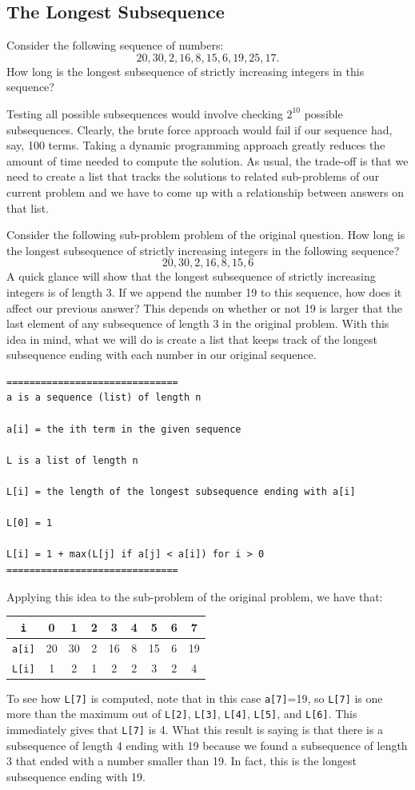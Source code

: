 \documentclass{ximera}
\begin{document}
\subsection{The Longest Subsequence}

Consider the following sequence of numbers: $$20,30,2,16,8,15,6,19,25,17.$$ How long is the longest subsequence of strictly increasing integers in this sequence?

Testing all possible subsequences would involve checking $2^{10}$ possible subsequences. Clearly, the brute force approach would fail if our sequence had, say, 100 terms. Taking a dynamic programming approach greatly reduces the amount of time needed to compute the solution. As usual, the trade-off is that we need to create a list that tracks the solutions to related sub-problems of our current problem and we have to come up with a relationship between answers on that list.

Consider the following sub-problem problem of the original question. How long is the longest subsequence of strictly increasing integers in the following sequence? $$20,30,2,16,8,15,6$$ A quick glance will show that the longest subsequence of strictly increasing integers is of length 3. If we append the number 19 to this sequence, how does it affect our previous answer? This depends on whether or not 19 is larger that the last element of any subsequence of length 3 in the original problem. With this idea in mind, what we will do is create a list that keeps track of the longest subsequence ending with each number in our original sequence. 

\begin{verbatim}
==============================
a is a sequence (list) of length n

a[i] = the ith term in the given sequence

L is a list of length n

L[i] = the length of the longest subsequence ending with a[i]

L[0] = 1

L[i] = 1 + max(L[j] if a[j] < a[i]) for i > 0
==============================
\end{verbatim}
Applying this idea to the sub-problem of the original problem, we have that:
\begin{center}
	\begin{tabular}{|c|c|c|c|c|c|c|c|c|}
		\hline
		\verb|i| & 0 & 1 & 2 & 3 & 4 & 5 & 6 & 7\\
		\hline
		\verb|a[i]| & 20 & 30 & 2 & 16 & 8 & 15 & 6 & 19 \\
		\hline
		\verb|L[i]| &  1 &  2 & 1 &  2 & 2 &  3 & 2 & 4 \\
		\hline
	\end{tabular}
\end{center}
To see how \verb|L[7]| is computed, note that in this case \verb|a[7]|=19, so \verb|L[7]| is one more than the maximum out of \verb|L[2]|, \verb|L[3]|, \verb|L[4]|, \verb|L[5]|, and \verb|L[6]|. This immediately gives that \verb|L[7]| is 4. What this result is saying is that there is a subsequence of length 4 ending with 19 because we found a subsequence of length 3 that ended with a number smaller than 19. In fact, this is the longest subsequence ending with 19.
\end{document}

